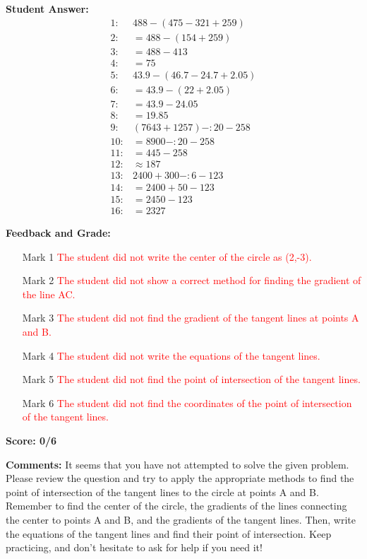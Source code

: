 \documentclass{article}
\begin{document}
\textbf{Student Answer:}
\begin{align*}
1: & 488-(475-321+259) \\
2: & =488-(154+259) \\
3: & =488-413 \\
4: & =75 \\
5: & 43.9-(46.7-24.7+2.05) \\
6: & =43.9-(22+2.05) \\
7: & =43.9-24.05 \\
8: & =19.85 \\
9: & (7643+1257)-:20-258 \\
10: & =8900-:20-258 \\
11: & =445-258 \\
12: & \approx 187 \\
13: & 2400+300-:6-123 \\
14: & =2400+50-123 \\
15: & =2450-123 \\
16: & =2327
\end{align*}

\textbf{Feedback and Grade:}
\begin{itemize}
\item[Mark 1] \textcolor{red}{The student did not write the center of the circle as (2,-3).}
\item[Mark 2] \textcolor{red}{The student did not show a correct method for finding the gradient of the line AC.}
\item[Mark 3] \textcolor{red}{The student did not find the gradient of the tangent lines at points A and B.}
\item[Mark 4] \textcolor{red}{The student did not write the equations of the tangent lines.}
\item[Mark 5] \textcolor{red}{The student did not find the point of intersection of the tangent lines.}
\item[Mark 6] \textcolor{red}{The student did not find the coordinates of the point of intersection of the tangent lines.}
\end{itemize}

\textbf{Score: 0/6}

\textbf{Comments:} It seems that you have not attempted to solve the given problem. Please review the question and try to apply the appropriate methods to find the point of intersection of the tangent lines to the circle at points A and B. Remember to find the center of the circle, the gradients of the lines connecting the center to points A and B, and the gradients of the tangent lines. Then, write the equations of the tangent lines and find their point of intersection. Keep practicing, and don't hesitate to ask for help if you need it!
\end{document}
